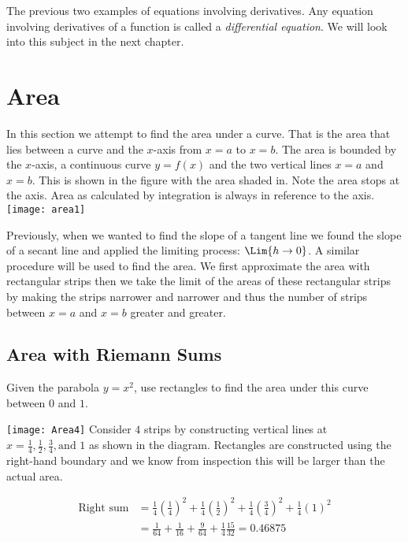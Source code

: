 The previous two examples of equations involving derivatives. Any equation involving derivatives of a function is called a \emph{differential equation}. We will look into this subject in the next chapter. 

\clearpage
\section{Area}\begin{multicols}{2}
In this section we attempt to find the area under a curve. That is the area that lies between a curve and the $x$-axis from $x =a$ to $x =b$. The area is bounded by the $x$-axis, a continuous curve $y =f (x)$ and the two vertical lines $x =a$ and $x =b$. This is shown in the figure with the area shaded in. Note the area stops at the axis. Area as calculated by integration is always in reference to the axis.\\
\texttt{[image: area1]}
\end{multicols}

Previously, when we wanted to find the slope of a tangent line we found the slope of a secant line and applied the limiting process: $\Lim{h\to 0}$. A similar procedure will be used to find the area. We first approximate the area with rectangular strips then we take the limit of the areas of these rectangular strips by making the strips narrower and narrower and thus the number of strips between $x =a$ and $x =b$ greater and greater. 

\subsection*{Area with Riemann Sums}
\example Given the parabola $y =x^{2}$, use rectangles to find the area under this curve between $0$ and $1$. 

\solution 
\begin{multicols}{2}
\texttt{[image: Area4]}\label{fig:riemann}
Consider $4$ strips by constructing vertical lines at $x =\frac{1}{4}, \frac{1}{2}, \frac{3}{4}, \text{and }1$ as shown in the diagram. Rectangles are constructed using the right-hand boundary and we know from inspection this will be larger than the actual area.
\end{multicols}
\begin{align*}
\text{Right sum} &  = \frac{1}{4} \genfrac{(}{)}{}{}{1}{4}^{2} +\frac{1}{4} \genfrac{(}{)}{}{}{1}{2}^{2} +\frac{1}{4} \genfrac{(}{)}{}{}{3}{4}^{2} +\frac{1}{4} \left (1\right )^{2} \\
 &  = \frac{1}{64} +\frac{1}{16} +\frac{9}{64} +\frac{1}{4} \frac{15}{32} =0.46875\end{align*}

